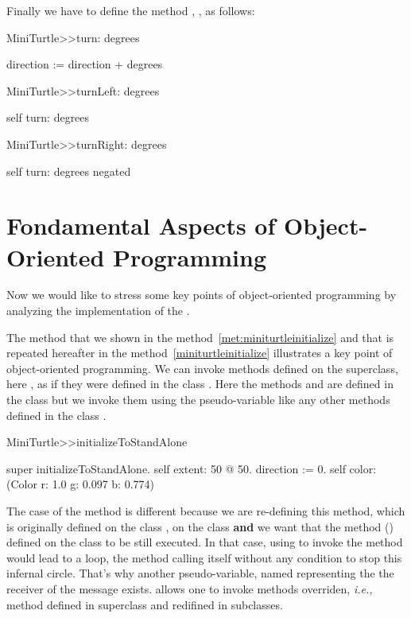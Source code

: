 Finally we have to define the method , ,  as follows:

\begin{method}
MiniTurtle>>turn: degrees

   direction := direction + degrees

MiniTurtle>>turnLeft: degrees
 
   self turn: degrees

MiniTurtle>>turnRight: degrees
 
   self turn: degrees negated
\end{method}



\section{Fondamental Aspects of Object-Oriented Programming}

Now we would like to stress some key points of object-oriented 
programming by analyzing the implementation of the \mt.

The method   that we shown in the 
method~\ref{met:miniturtleinitialize} and that is repeated hereafter 
in the method~\ref{miniturtleinitialize} illustrates a key point of
object-oriented programming. We can invoke methods defined on the
superclass, here , as if they were defined in the class
\mtc.  Here the methods  and  are defined in 
the class  but we invoke them using the pseudo-variable 
\self like any other methods defined in the class \mtc.


\begin{method}\label{miniturtleinitialize}
MiniTurtle>>initializeToStandAlone

   super initializeToStandAlone.
   self extent: 50 @ 50.
   direction := 0.
   self color: (Color r: 1.0 g: 0.097 b: 0.774)
\end{method}


The case of the method  is different because we are
re-defining this method, which is originally defined on the class
, on the class \mtc \textbf{and} we want that the method 
() defined on the class  to be still executed. 
In that case, using \self to invoke the method
 would lead to a loop, the method calling itself
without any condition to stop this infernal circle. That's why another
pseudo-variable, named \super representing the the receiver of the
message exists. \super allows one to invoke methods overriden, \emph{i.e.,}
method defined in superclass and redifined in subclasses.

